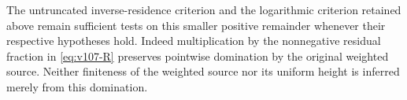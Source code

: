 \begin{remark}
The untruncated inverse-residence criterion and the logarithmic
criterion retained above remain sufficient tests on this smaller
positive remainder whenever their respective hypotheses hold.
Indeed multiplication by the nonnegative residual fraction in
\eqref{eq:v107-R} preserves pointwise domination by the original
weighted source. Neither finiteness of the weighted source nor its
uniform height is inferred merely from this domination.
\end{remark}
